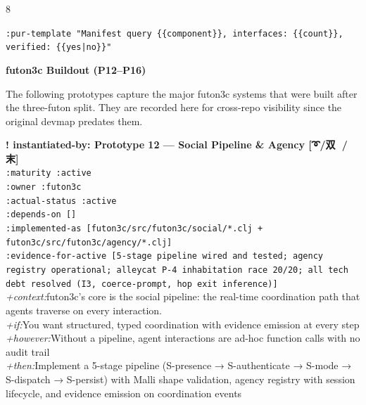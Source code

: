 \documentclass[landscape]{article}
\newcommand{\flexitag}[1]{\textcolor[gray]{0.35}{\textit{#1}}}
\newenvironment{devmapactive}{%
  \def\FrameCommand{\colorbox{devmapactivebg}}%
  \setlength{\fboxsep}{2pt}%
  \MakeFramed{\advance\hsize-\width \FrameRestore}%
}{\endMakeFramed}
\newenvironment{devmapgreenfield}{%
  \def\FrameCommand{\colorbox{devmapgreenfieldbg}}%
  \setlength{\fboxsep}{2pt}%
  \MakeFramed{\advance\hsize-\width \FrameRestore}%
}{\endMakeFramed}
\begin{document}
\begin{paracol}{8}
\begin{devmapgreenfield}
  \texttt{:\allowbreak{}pur-\allowbreak{}template "Manifest query \{\{component\}\},\allowbreak{} interfaces:\allowbreak{} \{\{count\}\},\allowbreak{} verified:\allowbreak{} \{\{yes|\allowbreak{}no\}\}"}\\
\par
\par
\textbf{futon3c Buildout (P12–P16)}\par
\par
The following prototypes capture the major futon3c systems that were built after the three-futon split. They are recorded here for cross-repo visibility since the original devmap predates them.\\
\par
\par
\end{devmapgreenfield}
\begin{devmapactive}
\textbf{! instantiated-by: Prototype 12 — Social Pipeline \& Agency [➰/双 🌽/末]}\\
  \texttt{:\allowbreak{}maturity :\allowbreak{}active}\\
  \texttt{:\allowbreak{}owner :\allowbreak{}futon3c}\\
  \texttt{:\allowbreak{}actual-\allowbreak{}status :\allowbreak{}active}\\
  \texttt{:\allowbreak{}depends-\allowbreak{}on []}\\
  \texttt{:\allowbreak{}implemented-\allowbreak{}as [futon3c/\allowbreak{}src/\allowbreak{}futon3c/\allowbreak{}social/\allowbreak{}*.clj +\allowbreak{} futon3c/\allowbreak{}src/\allowbreak{}futon3c/\allowbreak{}agency/\allowbreak{}*.clj]}\\
  \texttt{:\allowbreak{}evidence-\allowbreak{}for-\allowbreak{}active [5-\allowbreak{}stage pipeline wired and tested;\allowbreak{} agency registry operational;\allowbreak{} alleycat P-\allowbreak{}4 inhabitation race 20/\allowbreak{}20;\allowbreak{} all tech debt resolved (I3,\allowbreak{} coerce-\allowbreak{}prompt,\allowbreak{} hop exit inference)]}\\
  \flexitag{+context:}futon3c’s core is the social pipeline: the real-time coordination path that agents traverse on every interaction.\\
  \flexitag{+if:}You want structured, typed coordination with evidence emission at every step\\
  \flexitag{+however:}Without a pipeline, agent interactions are ad-hoc function calls with no audit trail\\
  \flexitag{+then:}Implement a 5-stage pipeline (S-presence → S-authenticate → S-mode → S-dispatch → S-persist) with Malli shape validation, agency registry with session lifecycle, and evidence emission on coordination events\\

\end{devmapactive}
\end{paracol}
\end{document}
